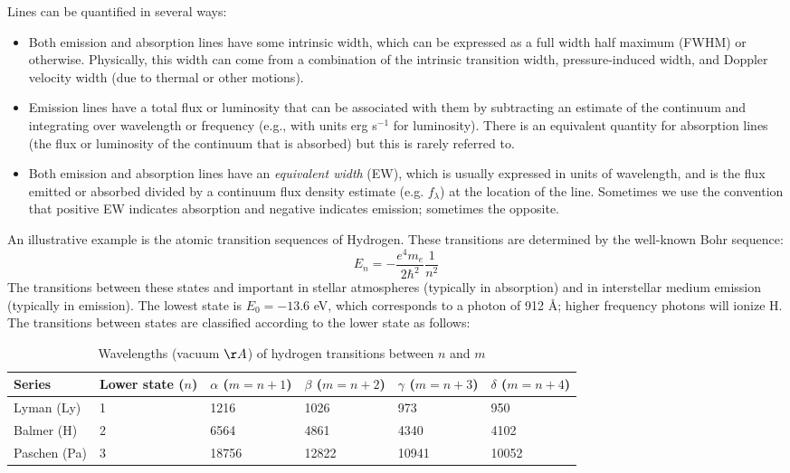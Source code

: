 Lines can be quantified in several ways:
\begin{itemize}
\item Both emission and absorption lines have some intrinsic width, which can
be expressed as a full width half maximum (FWHM) or
otherwise. Physically, this width can come from a combination of the
intrinsic transition width, pressure-induced width, and Doppler
velocity width (due to thermal or other motions).
\item Emission lines have a total flux or luminosity that can be associated
with them by subtracting an estimate of the continuum and integrating
over wavelength or frequency (e.g., with units erg s$^{-1}$ for
luminosity). There is an equivalent quantity for absorption lines (the
flux or luminosity of the continuum that is absorbed) but this is
rarely referred to.
\item Both emission and absorption lines  have an {\it equivalent
width} (EW), which is usually expressed in units of wavelength, and is
the flux emitted or absorbed divided by a continuum flux density
estimate (e.g. $f_\lambda$) at the location of the line. Sometimes we
use the convention that positive EW indicates absorption and negative
indicates emission; sometimes the opposite.
\end{itemize}

An illustrative example is the atomic transition sequences of
Hydrogen. These transitions are determined by the well-known Bohr
sequence:
\begin{equation}
E_n = - \frac{e^4m_e}{2\hbar^2} \frac{1}{n^2}
\end{equation}
The transitions between these states and important in stellar
atmospheres (typically in absorption) and in interstellar medium
emission (typically in emission). The lowest state is $E_0 = - 13.6$
eV, which corresponds to a photon of 912 \AA; higher frequency photons
will ionize H. The transitions between states are classified
according to the lower state as follows:

\begin{table}[htp]
\caption{
\label{table:hydrogen} Wavelengths (vacuum $\AA$) of hydrogen transitions between $n$ and $m$}
\begin{tabular}{llllll}
\hline\hline
Series & Lower state ($n$) & $\alpha$ ($m = n+1$) & $\beta$ ($m=n+2$)
& $\gamma$ ($m=n+3$) & $\delta$ ($m=n+4$) \\
\hline
Lyman (Ly) & 1 & 1216 & 1026	& 973	& 950 \\
Balmer (H) & 2 & 6564 & 4861	& 4340	& 4102 \\
Paschen (Pa) & 3 & 18756 & 12822	& 10941	& 10052 \\
\hline
\end{tabular}
\end{table}


